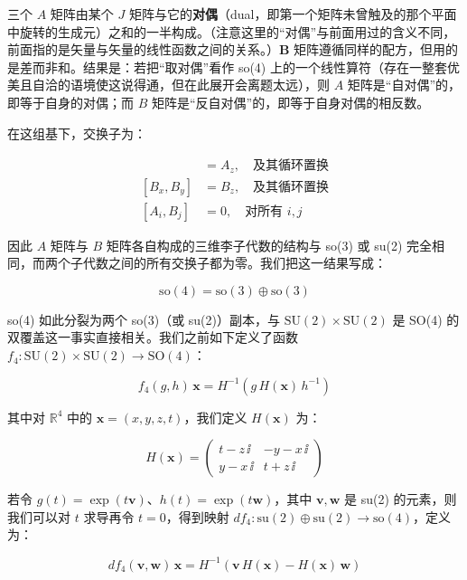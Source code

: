 三个 $A$ 矩阵由某个 $J$ 矩阵与它的\textbf{对偶}（dual，即第一个矩阵未曾触及的那个平面中旋转的生成元）之和的一半构成。（注意这里的“对偶”与前面用过的含义不同，前面指的是矢量与矢量的线性函数之间的关系。）\textbf{B} 矩阵遵循同样的配方，但用的是差而非和。结果是：若把“取对偶”看作 so(4) 上的一个线性算符（存在一整套优美且自洽的语境使这说得通，但在此展开会离题太远），则 $A$ 矩阵是“自对偶”的，即等于自身的对偶；而 $B$ 矩阵是“反自对偶”的，即等于自身对偶的相反数。

在这组基下，交换子为：

\begin{align}
[A_x,A_y] &= A_z, \quad \text{及其循环置换} \\
[B_x,B_y] &= B_z, \quad \text{及其循环置换} \\
[A_i,B_j] &= 0, \quad \text{对所有 } i,j
\end{align}

因此 $A$ 矩阵与 $B$ 矩阵各自构成的三维李子代数的结构与 so(3) 或 su(2) 完全相同，而两个子代数之间的所有交换子都为零。我们把这一结果写成：

\begin{equation}
\mathrm{so}(4) = \mathrm{so}(3)\oplus\mathrm{so}(3)
\end{equation}

so(4) 如此分裂为两个 so(3)（或 su(2)）副本，与 $\mathrm{SU}(2)\times\mathrm{SU}(2)$ 是 SO(4) 的双覆盖这一事实直接相关。我们之前如下定义了函数 $f_4:\mathrm{SU}(2)\times\mathrm{SU}(2)\to\mathrm{SO}(4)$：

\begin{equation}
f_4(g,h)\,\mathbf{x} = H^{-1}\!\left(g\,H(\mathbf{x})\,h^{-1}\right)
\end{equation}

其中对 $\mathbb{R}^{4}$ 中的 $\mathbf{x}=(x,y,z,t)$，我们定义 $H(\mathbf{x})$ 为：

\begin{equation}
H(\mathbf{x}) = \begin{pmatrix}
t - z\,\ii & -y - x\,\ii \\
y - x\,\ii & t + z\,\ii
\end{pmatrix}
\end{equation}

若令 $g(t)=\exp(t\mathbf{v})$、$h(t)=\exp(t\mathbf{w})$，其中 $\mathbf{v},\mathbf{w}$ 是 su(2) 的元素，则我们可以对 $t$ 求导再令 $t=0$，得到映射 $df_4:\mathrm{su}(2)\oplus\mathrm{su}(2)\to\mathrm{so}(4)$，定义为：

\begin{equation}
df_4(\mathbf{v},\mathbf{w})\,\mathbf{x} = H^{-1}\!\left(\mathbf{v}\,H(\mathbf{x}) - H(\mathbf{x})\,\mathbf{w}\right)
\end{equation}

